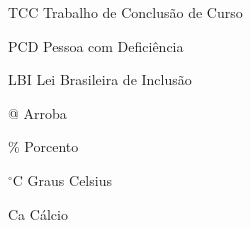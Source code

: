 
\listoffigures*
\cleardoublepage



\listoftables*
\cleardoublepage

\begin{siglas}
	\item[TCC] Trabalho de Conclusão de Curso
	\item[PCD] Pessoa com Deficiência
	\item[LBI] Lei Brasileira de Inclusão
\end{siglas}



\begin{simbolos}
  \item[@] Arroba
  \item[\%] Porcento
  \item[$^\circ$C] Graus Celsius
  \item[Ca] Cálcio
\end{simbolos}

